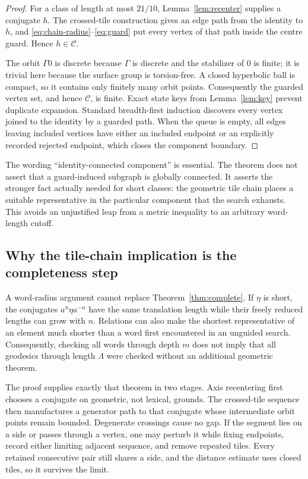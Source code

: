\documentclass[11pt,a4paper]{article}
\theoremstyle{definition}
\begin{document}
\begin{proof}
For a class of length at most \(21/10\), Lemma~\ref{lem:recenter} supplies a
conjugate \(h\).  The crossed-tile construction gives an edge path from the
identity to \(h\), and \eqref{eq:chain-radius}--\eqref{eq:guard} put every
vertex of that path inside the centre guard.  Hence \(h\in\mathcal C\).

The orbit \(\Gamma0\) is discrete because \(\Gamma\) is discrete and the
stabilizer of \(0\) is finite; it is trivial here because the surface group is
torsion-free.  A closed hyperbolic ball is compact, so it contains only
finitely many orbit points.  Consequently the guarded vertex set, and hence
\(\mathcal C\), is finite.  Exact state keys from Lemma~\ref{lem:key} prevent
duplicate expansion.  Standard breadth-first induction discovers every
vertex joined to the identity by a guarded path.  When the queue is empty,
all edges leaving included vertices have either an included endpoint or an
explicitly recorded rejected endpoint, which closes the component boundary.
\end{proof}

The wording ``identity-connected component'' is essential.  The theorem does
not assert that a guard-induced subgraph is globally connected.  It asserts
the stronger fact actually needed for short classes: the geometric tile
chain places a suitable representative in the particular component that the
search exhausts.  This avoids an unjustified leap from a metric inequality to
an arbitrary word-length cutoff.

\subsection{Why the tile-chain implication is the completeness step}

A word-radius argument cannot replace Theorem~\ref{thm:complete}.  If
\(\eta\) is short, the conjugates \(a^n\eta a^{-n}\) have the same translation
length while their freely reduced lengths can grow with \(n\).  Relations can
also make the shortest representative of an element much shorter than a word
first encountered in an unguided search.  Consequently, checking all words
through depth \(m\) does not imply that all geodesics through length
\(\Lambda\) were checked without an additional geometric theorem.

The proof supplies exactly that theorem in two stages.  Axis recentering first
chooses a conjugate on geometric, not lexical, grounds.  The crossed-tile
sequence then manufactures a generator path to that conjugate whose
intermediate orbit points remain bounded.  Degenerate crossings cause no
gap.  If the segment lies on a side or passes through a vertex, one may
perturb it while fixing endpoints, record either limiting adjacent sequence,
and remove repeated tiles.  Every retained consecutive pair still shares a
side, and the distance estimate uses closed tiles, so it survives the limit.
\end{document}
